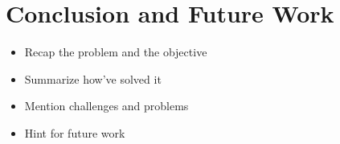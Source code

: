 \section{Conclusion and Future Work}
\begin{itemize}
  \item Recap the problem and the objective
  \item Summarize how've solved it
  \item Mention challenges and problems
  \item Hint for future work
\end{itemize}
